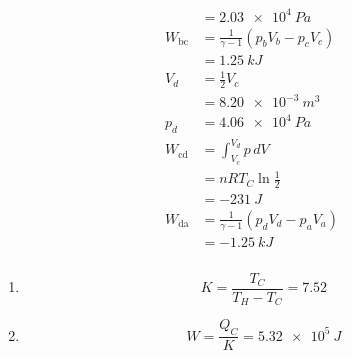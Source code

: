 \documentclass{article}
\begin{document}
\begin{enumerate}
\begin{align*}
                      & = \qty{2.03e4}{Pa}                                      \\
          W_\text{bc} & = \frac{1}{\gamma - 1} (p_b V_b - p_c V_c)              \\
                      & = \qty{1.25}{kJ}                                        \\
          V_d         & = \frac{1}{2} V_c                                       \\
                      & = \qty{8.20e-3}{m^3}                                    \\
          p_d         & = \qty{4.06e4}{Pa}                                      \\
          W_\text{cd} & = \int_{V_c}^{V_d} p \,d V                              \\
                      & = n R T_C \ln \frac{1}{2}                               \\
                      & = \qty{-231}{J}                                         \\
          W_\text{da} & = \frac{1}{\gamma - 1} (p_d V_d - p_a V_a)              \\
                      & = \qty{-1.25}{kJ}
        \end{align*}
\end{enumerate}

\subsubsection{}

\begin{enumerate}
  \item \[K = \frac{T_C}{T_H - T_C} = 7.52\]

  \item \[W = \frac{Q_C}{K} = \qty{5.32e5}{J}\]
\end{enumerate}

\subsubsection{}
\end{document}
